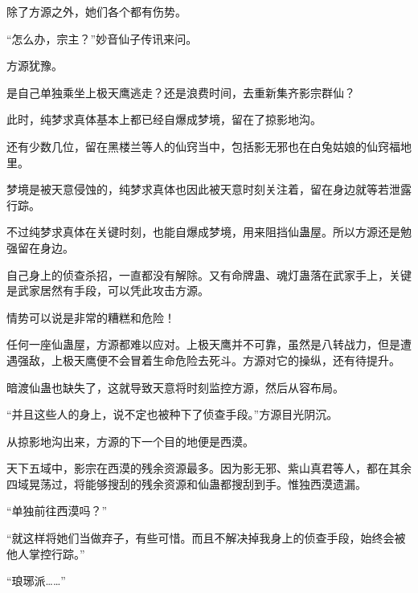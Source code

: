 \begin{this_body}
除了方源之外，她们各个都有伤势。

“怎么办，宗主？”妙音仙子传讯来问。

方源犹豫。

是自己单独乘坐上极天鹰逃走？还是浪费时间，去重新集齐影宗群仙？

此时，纯梦求真体基本上都已经自爆成梦境，留在了掠影地沟。

还有少数几位，留在黑楼兰等人的仙窍当中，包括影无邪也在白兔姑娘的仙窍福地里。

梦境是被天意侵蚀的，纯梦求真体也因此被天意时刻关注着，留在身边就等若泄露行踪。

不过纯梦求真体在关键时刻，也能自爆成梦境，用来阻挡仙蛊屋。所以方源还是勉强留在身边。

自己身上的侦查杀招，一直都没有解除。又有命牌蛊、魂灯蛊落在武家手上，关键是武家居然有手段，可以凭此攻击方源。

情势可以说是非常的糟糕和危险！

任何一座仙蛊屋，方源都难以应对。上极天鹰并不可靠，虽然是八转战力，但是遭遇强敌，上极天鹰便不会冒着生命危险去死斗。方源对它的操纵，还有待提升。

暗渡仙蛊也缺失了，这就导致天意将时刻监控方源，然后从容布局。

“并且这些人的身上，说不定也被种下了侦查手段。”方源目光阴沉。

从掠影地沟出来，方源的下一个目的地便是西漠。

天下五域中，影宗在西漠的残余资源最多。因为影无邪、紫山真君等人，都在其余四域晃荡过，将能够搜刮的残余资源和仙蛊都搜刮到手。惟独西漠遗漏。

“单独前往西漠吗？”

“就这样将她们当做弃子，有些可惜。而且不解决掉我身上的侦查手段，始终会被他人掌控行踪。”

“琅琊派……”

\end{this_body}


